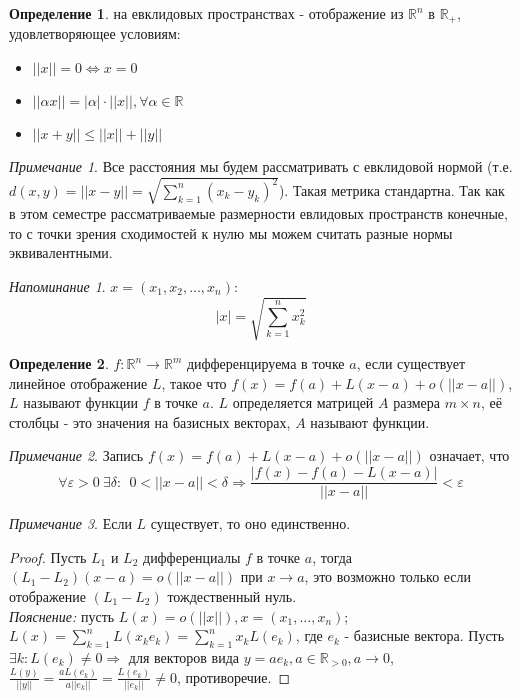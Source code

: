 \documentclass[a4paper]{article}
\theoremstyle{indented}
\theoremstyle{definition}
\newtheorem{defn}{Определение}
\theoremstyle{remark}
\newtheorem{remark}{Примечание}
\newtheorem{remind}{Напоминание}
\begin{document}
\begin{defn}
     на евклидовых пространствах - отображение из $\mathbb{R}^n$ в $\mathbb{R}_+$, удовлетворяющее условиям:
    \begin{itemize}
        \item $||x||=0 \Leftrightarrow x=0$
        \item $||\alpha x|| = |\alpha| \cdot ||x||, \forall \alpha \in \mathbb{R}$
        \item $||x+y|| \leq ||x|| + ||y||$
    \end{itemize} 
\end{defn}

\begin{remark}
    Все расстояния мы будем рассматривать с евклидовой нормой
    (т.е. $d(x,y)=||x-y||=\sqrt{\sum\limits_{k=1}^{n}(x_k-y_k)^2}$).
    Такая метрика стандартна. Так как в этом семестре рассматриваемые размерности 
    евлидовых пространств конечные, то с точки зрения сходимостей к нулю мы можем считать 
    разные нормы эквивалентными.
\end{remark}

\begin{remind}
     $x=(x_1,x_2, ... , x_n)$:
    \[
        |x|=\sqrt{\sum\limits_{k=1}^{n}x_k^2}
    \]
\end{remind}

\begin{defn}
    $f: \mathbb{R}^n \to \mathbb{R}^m$ дифференцируема в точке $a$, если
    существует линейное отображение $L$, такое что $f(x)=f(a)+L(x-a)+o(||x-a||)$,
    $L$ называют  функции $f$ в точке $a$.
    $L$ определяется матрицей $A$ размера $m \times n$, её столбцы -
    это значения на базисных векторах, $A$ называют  функции.
\end{defn}

\begin{remark}
    Запись $f(x)=f(a)+L(x-a)+o(||x-a||)$ означает, что
    \[ \forall \varepsilon > 0 \ \exists \delta: \ \ 0 < ||x-a|| < \delta \Rightarrow \frac{|f(x)-f(a)-L(x-a)|}{||x-a||} < \varepsilon \]
\end{remark}

\begin{remark}
    Если $L$ существует, то оно единственно.
    \begin{proof}
        Пусть $L_1$ и $L_2$ дифференциалы $f$ в точке $a$, тогда \\
        $(L_1-L_2)(x-a)=o(||x-a||)$ при $x\to a$, это возможно только
        если отображение $(L_1-L_2)$ тождественный нуль.\\
        \textit{Пояснение: } пусть $L(x)=o(||x||), x=(x_1,...,x_n)$; $L(x)=\sum\limits_{k=1}^{n} L(x_k e_k) =
        \sum\limits_{k=1}^{n} x_k L(e_k)$, где $e_k$ - базисные вектора. 
        Пусть $\exists k: L(e_k)\not=0 \Rightarrow $ для векторов вида $y=a e_k, a\in\mathbb{R}_{>0}, a \to 0$,
        $\frac{L(y)}{||y||}=\frac{aL(e_k)}{a||e_k||}=\frac{L(e_k)}{||e_k||} \not=0 $, противоречие. 
    \end{proof}
\end{remark}
\end{document}

